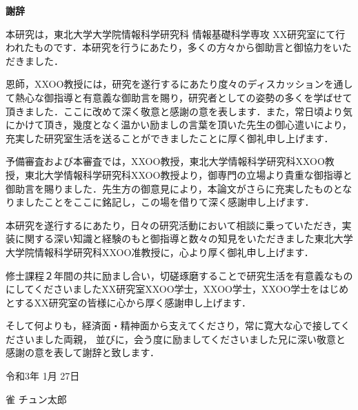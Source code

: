 \thispagestyle{empty}

\vspace*{5mm}
\noindent
{\Huge {\bf 謝辞}}\\
\bigskip

本研究は，東北大学大学院情報科学研究科 情報基礎科学専攻 XX研究室にて行われたものです．本研究を行うにあたり，多くの方々から御助言と御協力をいただきました．

恩師，XXOO教授には，研究を遂行するにあたり度々のディスカッションを通して熱心な御指導と有意義な御助言を賜り，研究者としての姿勢の多くを学ばせて頂きました．ここに改めて深く敬意と感謝の意を表します．また，常日頃より気にかけて頂き，幾度となく温かい励ましの言葉を頂いた先生の御心遣いにより，充実した研究室生活を送ることができましたことに厚く御礼申し上げます．

予備審査および本審査では，XXOO教授，東北大学情報科学研究科XXOO教授，東北大学情報科学研究科XXOO教授より，御専門の立場より貴重な御指導と御助言を賜りました．先生方の御意見により，本論文がさらに充実したものとなりましたことをここに銘記し，この場を借りて深く感謝申し上げます．

本研究を遂行するにあたり，日々の研究活動において相談に乗っていただき，実装に関する深い知識と経験のもと御指導と数々の知見をいただきました東北大学大学院情報科学研究科XXOO准教授に，心より厚く御礼申し上げます．

修士課程２年間の共に励まし合い，切磋琢磨することで研究生活を有意義なものにしてくださいましたXX研究室XXOO学士，XXOO学士，XXOO学士をはじめとするXX研究室の皆様に心から厚く感謝申し上げます．

そして何よりも，経済面・精神面から支えてくださり，常に寛大な心で接してくださいました両親，
並びに，会う度に励ましてくださいました兄に深い敬意と感謝の意を表して謝辞と致します．

\begin{flushright}
令和3年 1月 27日

雀 チュン太郎
\end{flushright}

